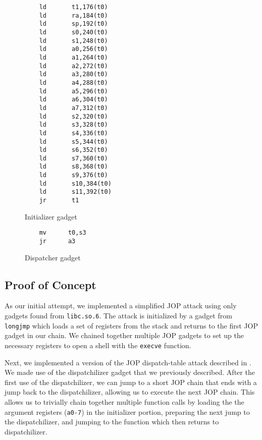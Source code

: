 \begin{figure}
    \caption{Initializer gadget}
    \label{initializer gadget}
    \begin{lstlisting}
    ld       t1,176(t0)
    ld       ra,184(t0)
    ld       sp,192(t0)
    ld	     s0,240(t0)
    ld	     s1,248(t0)
    ld	     a0,256(t0)
    ld	     a1,264(t0)
    ld	     a2,272(t0)
    ld	     a3,280(t0)
    ld	     a4,288(t0)
    ld	     a5,296(t0)
    ld	     a6,304(t0)
    ld	     a7,312(t0)
    ld	     s2,320(t0)
    ld	     s3,328(t0)
    ld	     s4,336(t0)
    ld	     s5,344(t0)
    ld	     s6,352(t0)
    ld	     s7,360(t0)
    ld	     s8,368(t0)
    ld	     s9,376(t0)
    ld	     s10,384(t0)
    ld	     s11,392(t0)
    jr	     t1
    \end{lstlisting}
\end{figure}

\begin{figure}
    \caption{Dispatcher gadget}
    \label{dispatcher gadget}
    \begin{lstlisting}
    mv      t0,s3
    jr      a3
    \end{lstlisting}
\end{figure}

\subsection{Proof of Concept}

As our initial attempt, we implemented a simplified JOP attack using only
gadgets found from \verb|libc.so.6|. The attack is initialized by a gadget from
\verb|longjmp| which loads a set of registers from the stack and returns to the
first JOP gadget in our chain. We chained together multiple JOP gadgets to set
up the necessary registers to open a shell with the \verb|execve| function.

Next, we implemented a version of the JOP dispatch-table attack described in
\cite{bletsch11jopx86}. We made use of the dispatchilizer gadget that we
previously described. After the first use of the dispatchilizer, we can jump to
a short JOP chain that ends with a jump back to the dispatchilizer, allowing us
to execute the next JOP chain. This allows us to trivially chain together
multiple function calls by loading the the argument registers (\verb|a0-7|) in
the initializer portion, preparing the next jump to the dispatchilizer, and
jumping to the function which then returns to dispatchilizer. 

